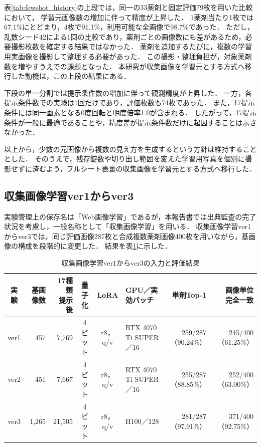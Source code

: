 \documentclass[uplatex,dvipdfmx]{jsarticle}
\begin{document}
表\ref{tab:fewshot_history}の上段では，同一の33薬剤と固定評価79枚を用いた比較において，
学習元画像数の増加に伴って精度が上昇した．
1薬剤当たり1枚では67.1\%にとどまり，4枚で91.1\%，利用可能な全画像で98.7\%であった．
ただし，乱数シード42による1回の比較であり，薬剤ごとの画像数にも差があるため，必要撮影枚数を確定する結果ではなかった．
薬剤を追加するたびに，複数の学習用実画像を撮影して整理する必要があった．
この撮影・整理負担が，対象薬剤数を増やすうえでの課題となった．
本研究が収集画像を学習元とする方式へ移行した動機は，この上段の結果にある．

下段の単一分割では提示条件数の増加に伴って観測精度が上昇した．
一方，各提示条件数での実験は1回だけであり，評価枚数も74枚であった．
また，17提示条件には同一画素となる0度回転と明度倍率1.0が含まれる．
したがって，17提示条件が一般に最適であることや，精度差が提示条件数だけに起因することは示さなかった．

以上から，少数の元画像から複数の見え方を生成するという方針は維持することとした．
そのうえで，残存錠数や切り出し範囲を変えた学習用写真を個別に撮影せずに済むよう，フルシート表裏の収集画像を学習元とする方式へ移行した．

\subsection{収集画像学習ver1からver3}\label{sec:ver1_v3}

実験管理上の保存名は「Web画像学習」であるが，本報告書では出典監査の完了状況を考慮し，一般名称として「収集画像学習」を用いる．
収集画像学習ver1からver3では，同じ評価画像287枚と合成複数薬剤画像400枚を用いながら，基画像の構成を段階的に変更した．
結果を表\ref{tab:web_v1_v3}に示した．

\begin{table}[htbp]
  \centering
  \caption{収集画像学習ver1からver3の入力と評価結果}
  \label{tab:web_v1_v3}
  \small
  \setlength{\tabcolsep}{2pt}
  \begin{tabular}{|c|r|r|c|c|p{2.7cm}|r|r|}
    \hline
    実験 & 基画像数 & \shortstack{17種類\\提示後} & 量子化 & LoRA & GPU／実効バッチ & 単剤Top-1 & \shortstack{画像単位\\完全一致} \\ \hline
    ver1 & 457 & 7,769 & 4ビット & r8，q/v & RTX 4070 Ti SUPER／16 & 259/287（90.24\%） & 245/400（61.25\%） \\ \hline
    ver2 & 451 & 7,667 & 4ビット & r8，q/v & RTX 4070 Ti SUPER／16 & 255/287（88.85\%） & 252/400（63.00\%） \\ \hline
    ver3 & 1,265 & 21,505 & 4ビット & r8，q/v & H100／128 & 281/287（97.91\%） & 371/400（92.75\%） \\ \hline
  \end{tabular}
\end{table}
\end{document}
